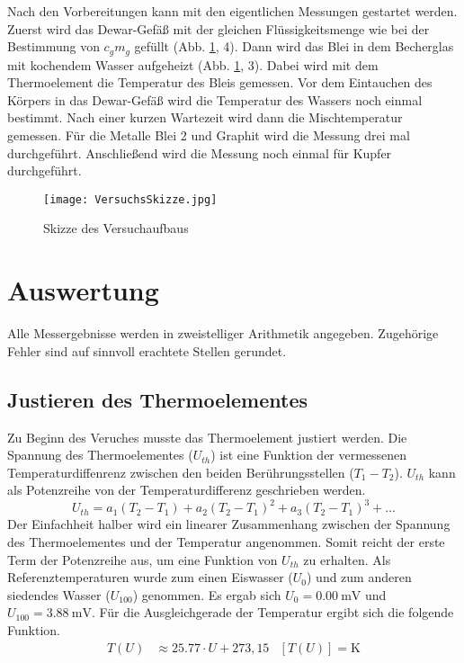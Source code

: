 Nach den Vorbereitungen kann mit den eigentlichen Messungen gestartet werden.
Zuerst wird das Dewar-Gefäß mit der gleichen Flüssigkeitsmenge wie bei der
Bestimmung von $c_g m_g$ gefüllt (Abb. \ref{fig:Skizze}, 4). Dann wird das Blei in dem Becherglas mit kochendem
Wasser aufgeheizt (Abb. \ref{fig:Skizze}, 3). Dabei wird mit dem Thermoelement die Temperatur des Bleis
gemessen. Vor dem Eintauchen des Körpers in das Dewar-Gefäß wird die
Temperatur des Wassers noch einmal bestimmt. Nach einer kurzen Wartezeit wird
dann die Mischtemperatur gemessen.
Für die Metalle Blei 2 und Graphit wird die Messung drei mal durchgeführt.
Anschließend wird die Messung noch einmal für Kupfer durchgeführt.

\begin{figure}
  \texttt{[image: VersuchsSkizze.jpg]}
  \caption{Skizze des Versuchaufbaus}
  \label{fig:Skizze}
\end{figure}

\newpage

\section{Auswertung}

Alle Messergebnisse werden in zweistelliger Arithmetik angegeben. Zugehörige
Fehler sind auf sinnvoll erachtete Stellen gerundet.

\subsection{Justieren des Thermoelementes}
Zu Beginn des Veruches musste das Thermoelement justiert werden. Die Spannung des Thermoelementes
($U_{th}$) ist eine Funktion der vermessenen Temperaturdiffenrenz zwischen den beiden
Berührungsstellen ($T_1 - T_2$). $U_{th}$ kann als Potenzreihe von der Temperaturdifferenz
geschrieben werden.
\begin{equation}
  U_{th} = a_1(T_2 - T_1) + a_2(T_2-T_1)^2 + a_3(T_2-T_1)^3+\textbf{...}
\end{equation}
Der Einfachheit halber wird ein linearer Zusammenhang zwischen der Spannung
des Thermoelementes und der Temperatur angenommen. Somit reicht der erste Term
der Potenzreihe aus, um eine Funktion von $U_{th}$ zu erhalten.
Als Referenztemperaturen wurde zum einen Eiswasser ($U_0$) und zum anderen siedendes
Wasser ($U_{100}$) genommen.
Es ergab sich $U_0 = \SI{0,00}{\milli\volt}$ und $U_{100} = \SI{3,88}{\milli\volt}$.
Für die Ausgleichgerade der Temperatur ergibt sich die folgende Funktion.
\begin{align*}
  T(U) &\approx 25.77 \cdot U + 273,15 & [T(U)] = \si{\kelvin}
\end{align*}

